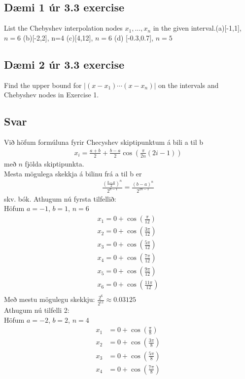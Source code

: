 \documentclass[11pt]{article}
\begin{document}
\subsection*{Dæmi 1 úr 3.3 exercise}
List the Chebyshev interpolation nodes $x_1,...,x_n$ in the given interval.(a)[-1,1], $n=6$ (b)[-2,2], n=4 (c)[4,12], $n=6$ (d) [-0.3,0.7], $n=5$

\subsection*{Dæmi 2 úr 3.3 exercise}
Find the upper bound for $|(x-x_1)\cdots (x-x_n)|$ on the intervals and Chebyshev nodes in Exercise 1.

\subsection*{Svar}
Við höfum formúluna fyrir Checyshev skiptipunktum á bili a til b
\begin{align*}
x_i = \frac{a+b}{2}+\frac{b-a}{2}\cos\left(\frac{\pi}{2n}(2i-1)\right)
\end{align*}
með $n$ fjölda skiptipunkta.\\
Mesta mögulega skekkja á bilinu frá a til b er 
\begin{align*}
\frac{\left(\frac{b-a}{2}\right)^n}{2^{n-1}} = \frac{(b-a)^n}{2^{2n-1}}
\end{align*}
skv. bók.
Athugum nú fyrsta tilfellið:\\
Höfum $a=-1$, $b=1$, $n=6$
\begin{align*}
x_1 = 0+\cos\left(\frac{\pi}{12}\right)\\
x_2 = 0+\cos\left(\frac{3\pi}{12}\right)\\
x_3 = 0+\cos\left(\frac{5\pi}{12}\right)\\
x_4 = 0+\cos\left(\frac{7\pi}{12}\right)\\
x_5 = 0+\cos\left(\frac{9\pi}{12}\right)\\
x_6 = 0+\cos\left(\frac{11\pi}{12}\right)\\
\end{align*}
Með mestu mögulegu skekkju: $ \frac{2^6}{2^{11}} \approx 0.03125$\\
Athugum nú tilfelli 2:\\
Höfum $a=-2$, $b=2$, $n=4$
\begin{align*}
x_1 &= 0+\cos\left(\frac{\pi}{8}\right)\\
x_2 &= 0+\cos\left(\frac{3\pi}{8}\right)\\
x_3 &= 0+\cos\left(\frac{5\pi}{8}\right)\\
x_4 &= 0+\cos\left(\frac{7\pi}{8}\right)\\
\end{align*}
\end{document}
